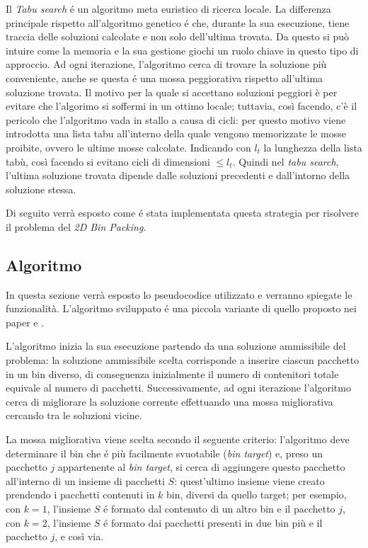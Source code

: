 Il \textit{Tabu search} é un algoritmo meta euristico di ricerca locale. La differenza principale rispetto all'algoritmo genetico é che, durante la sua esecuzione, tiene traccia delle soluzioni calcolate e non solo dell'ultima trovata. Da questo si può intuire come la memoria e la sua gestione giochi un ruolo chiave in questo tipo di approccio. Ad ogni iterazione, l'algoritmo cerca di trovare la soluzione più conveniente, anche se questa é una mossa peggiorativa rispetto all'ultima soluzione trovata. Il motivo per la quale si accettano soluzioni peggiori è per evitare che l'algorimo si soffermi in un ottimo locale; tuttavia, così facendo, c'è il pericolo che l'algoritmo vada in stallo a causa di cicli: per questo motivo viene introdotta una lista tabu all'interno della quale vengono memorizzate le mosse proibite, ovvero le ultime mosse calcolate. Indicando con $l_t$ la lunghezza della lista tabù, così facendo si evitano cicli di dimensioni $\le l_t$. Quindi nel \textit{tabu search}, l'ultima soluzione trovata dipende dalle soluzioni precedenti e dall'intorno della soluzione stessa.
   
Di seguito verrà esposto come é stata implementata questa strategia per risolvere il problema del \textit{2D Bin Packing}.

\subsection{Algoritmo}
In questa sezione verrà esposto lo pseudocodice utilizzato e verranno spiegate le funzionalità. L'algoritmo sviluppato é una piccola variante di quello proposto nei paper \cite{lmvTabu} e \cite{lmvTspack}.

L'algoritmo inizia la sua esecuzione partendo da una soluzione ammissibile del problema: la soluzione ammissibile scelta corrisponde a inserire ciascun pacchetto in un bin diverso, di conseguenza inizialmente il numero di contenitori totale equivale al numero di pacchetti. Successivamente, ad ogni iterazione l'algoritmo cerca di migliorare la soluzione corrente effettuando una mossa migliorativa cercando tra le soluzioni vicine.

La mossa migliorativa viene scelta secondo il seguente criterio: l'algoritmo deve determinare il bin che é più facilmente svuotabile (\textit{bin target}) e, preso un pacchetto $j$ appartenente al \textit{bin target}, si cerca di aggiungere questo pacchetto all'interno di un insieme di pacchetti $S$: quest'ultimo insieme viene creato prendendo i pacchetti contenuti in $k$ bin, diversi da quello target; per esempio, con $k=1$, l'insieme $S$ é formato dal contenuto di un altro bin e il pacchetto $j$, con $k=2$, l'insieme $S$ é formato dai pacchetti presenti in due bin più e il pacchetto $j$, e così via.

